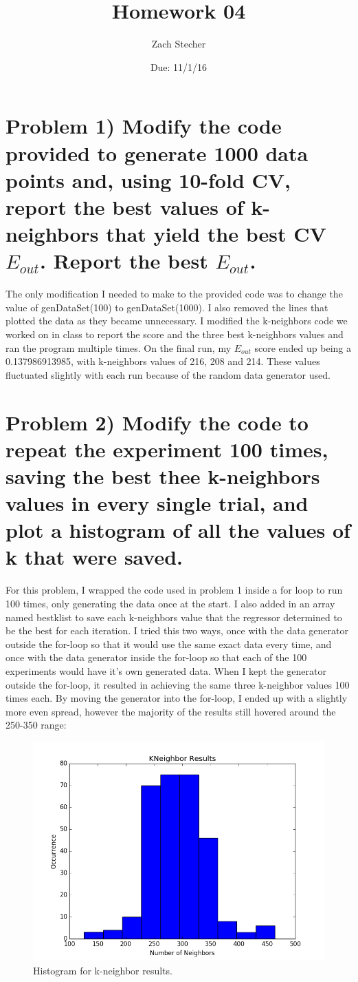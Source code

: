 \documentclass[11pt]{article}
\title{Homework 04}
\author{Zach Stecher}
\date{Due: 11/1/16}
\begin{document}
\maketitle

\section*{Problem 1) Modify the code provided to generate 1000 data points and, using 10-fold CV, report the best values of k-neighbors that yield the best CV $E_{out}$. Report the best $E_{out}$.}

The only modification I needed to make to the provided code was to change the value of genDataSet(100) to genDataSet(1000). I also removed the lines that plotted the data as they became unnecessary. I modified the k-neighbors code we worked on in class to report the score and the three best k-neighbors values and ran the program multiple times. On the final run, my $E_{out}$ score ended up being a 0.137986913985, with k-neighbors values of 216, 208 and 214. These values fluctuated slightly with each run because of the random data generator used.

\section*{Problem 2) Modify the code to repeat the experiment 100 times, saving the best thee k-neighbors values in every single trial, and plot a histogram of all the values of k that were saved.}

For this problem, I wrapped the code used in problem 1 inside a for loop to run 100 times, only generating the data once at the start. I also added in an array named bestklist to save each k-neighbors value that the regressor determined to be the best for each iteration. I tried this two ways, once with the data generator outside the for-loop so that it would use the same exact data every time, and once with the data generator inside the for-loop so that each of the 100 experiments would have it's own generated data. When I kept the generator outside the for-loop, it resulted in achieving the same three k-neighbor values 100 times each. By moving the generator into the for-loop, I ended up with a slightly more even spread, however the majority of the results still hovered around the 250-350 range:

\begin{figure}[!htb]
	\includegraphics[width=\linewidth]{kneighhistogram.png}
	\caption{Histogram for k-neighbor results.}
\end{figure}
\end{document}
